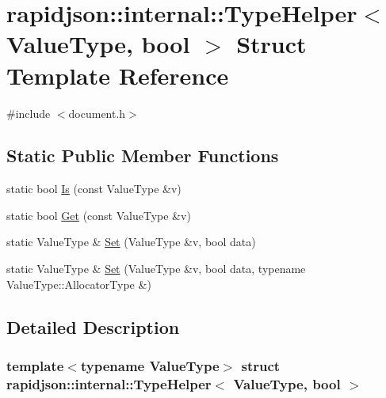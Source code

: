 \hypertarget{structrapidjson_1_1internal_1_1_type_helper_3_01_value_type_00_01bool_01_4}{}\section{rapidjson\+::internal\+::Type\+Helper$<$ Value\+Type, bool $>$ Struct Template Reference}
\label{structrapidjson_1_1internal_1_1_type_helper_3_01_value_type_00_01bool_01_4}


{\ttfamily \#include $<$document.\+h$>$}

\subsection*{Static Public Member Functions}
\begin{DoxyCompactItemize}
\item 
static bool \mbox{\hyperlink{structrapidjson_1_1internal_1_1_type_helper_3_01_value_type_00_01bool_01_4_a5577bfb255fdaeb64f8cccf716d7e1b0}{Is}} (const Value\+Type \&v)
\item 
static bool \mbox{\hyperlink{structrapidjson_1_1internal_1_1_type_helper_3_01_value_type_00_01bool_01_4_a776d7497d93abe98a479987dcb26be02}{Get}} (const Value\+Type \&v)
\item 
static Value\+Type \& \mbox{\hyperlink{structrapidjson_1_1internal_1_1_type_helper_3_01_value_type_00_01bool_01_4_abb346f12bdc124b5f431c37d28d7ca52}{Set}} (Value\+Type \&v, bool data)
\item 
static Value\+Type \& \mbox{\hyperlink{structrapidjson_1_1internal_1_1_type_helper_3_01_value_type_00_01bool_01_4_a3902ac38924f6456609c30807e3a97bc}{Set}} (Value\+Type \&v, bool data, typename Value\+Type\+::\+Allocator\+Type \&)
\end{DoxyCompactItemize}


\subsection{Detailed Description}
\subsubsection*{template$<$typename Value\+Type$>$\newline
struct rapidjson\+::internal\+::\+Type\+Helper$<$ Value\+Type, bool $>$}



